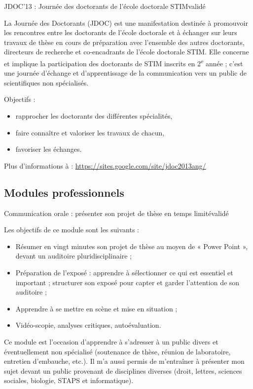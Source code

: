 \formation
{JDOC'13 : Journée des doctorants de l'école doctorale STIM}{validé}
{La Journée des Doctorants (JDOC) est une manifestation destinée à promouvoir les rencontres entre les doctorants de l'école doctorale et à échanger sur leurs travaux de thèse en cours de préparation avec l'ensemble des autres doctorants, directeurs de recherche et co-encadrants de l'école doctorale STIM. Elle concerne et implique la participation des doctorants de STIM inscrits en 2\textsuperscript{e} année ; c'est une journée d'échange et d'apprentissage de la communication vers un public de scientifiques non spécialisés.

Objectifs :
\begin{itemize}
  \item rapprocher les doctorants des différentes spécialités,
  \item faire connaître et valoriser les travaux de chacun,
  \item favoriser les échanges.
\end{itemize}

Plus d'informations à : \url{https://sites.google.com/site/jdoc2013ang/}}



\subsection{Modules professionnels}

\formation
{Communication orale : présenter son projet de thèse en temps limité}{validé}
{Les objectifs de ce module sont les suivants :
\begin{itemize}
  \item Résumer en vingt minutes son projet de thèse au moyen de « Power Point », devant un auditoire pluridisciplinaire ;
  \item Préparation de l'exposé : apprendre à sélectionner ce qui est essentiel et important ; structurer son exposé pour capter et garder l'attention de son auditoire ;
  \item Apprendre à se mettre en scène et mise en situation ;
  \item Vidéo-scopie, analyses critiques, autoévaluation.
\end{itemize}

Ce module est l'occasion d'apprendre à s'adresser à un public divers et éventuellement non spécialisé (soutenance de thèse, réunion de laboratoire, entretien d'embauche, etc.).
Il m'a aussi permis de m'entraîner à présenter mon sujet devant un public provenant de disciplines diverses (droit, lettres, sciences sociales, biologie, STAPS et informatique).}

